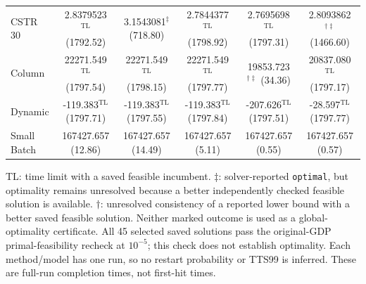\documentclass{article}
\begin{document}
\begin{table}[htbp]
\begin{tabular}{@{}lccccc@{}}
CSTR 30 & \makecell{2.8379523\({}^{\mathrm{TL}}\)\\(1792.52)} & \makecell{3.1543081\({}^{\ddagger}\)\\(718.80)} & \makecell{2.7844377\({}^{\mathrm{TL}}\)\\(1798.92)} & \makecell{2.7695698\({}^{\mathrm{TL}}\)\\(1797.31)} & \makecell{2.8093862\({}^{\dagger\ddagger}\)\\(1466.60)} \\
Column & \makecell{22271.549\({}^{\mathrm{TL}}\)\\(1797.54)} & \makecell{22271.549\({}^{\mathrm{TL}}\)\\(1798.15)} & \makecell{22271.549\({}^{\mathrm{TL}}\)\\(1797.77)} & \makecell{19853.723\({}^{\dagger\ddagger}\)\\(34.36)} & \makecell{20837.080\({}^{\mathrm{TL}}\)\\(1797.17)} \\
Dynamic & \makecell{-119.383\({}^{\mathrm{TL}}\)\\(1797.71)} & \makecell{-119.383\({}^{\mathrm{TL}}\)\\(1797.55)} & \makecell{-119.383\({}^{\mathrm{TL}}\)\\(1797.84)} & \makecell{-207.626\({}^{\mathrm{TL}}\)\\(1797.51)} & \makecell{-28.597\({}^{\mathrm{TL}}\)\\(1797.77)} \\
Small Batch & \makecell{167427.657\\(12.86)} & \makecell{167427.657\\(14.49)} & \makecell{167427.657\\(5.11)} & \makecell{167427.657\\(0.55)} & \makecell{167427.657\\(0.57)} \\
\bottomrule
\end{tabular}
\par\vspace{3pt}
\begin{minipage}{0.99\linewidth}
\footnotesize TL: time limit with a saved feasible incumbent. \(\ddagger\): solver-reported \texttt{optimal}, but optimality remains unresolved because a better independently checked feasible solution is available. \(\dagger\): unresolved consistency of a reported lower bound with a better saved feasible solution. Neither marked outcome is used as a global-optimality certificate. All 45 selected saved solutions pass the original-GDP primal-feasibility recheck at \(10^{-5}\); this check does not establish optimality. Each method/model has one run, so no restart probability or TTS99 is inferred. These are full-run completion times, not first-hit times.
\end{minipage}
\end{table}
\FloatBarrier
\end{document}
